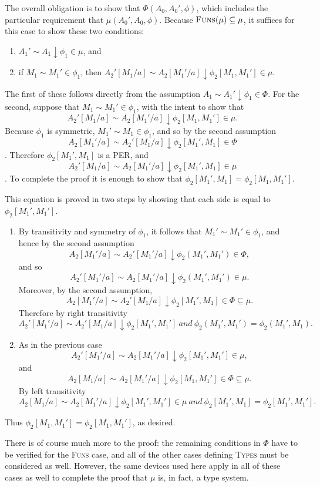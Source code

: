 \documentclass[11pt,twoside]{article}
\begin{document}
The overall obligation is to show that $\Phi(A_{0},A_{0}',\phi)$, which includes the particular
requirement that $\mu(A_{0}',A_{0},\phi)$.  Because $\textsc{Funs}(\mu)\subseteq\mu$, it suffices for this
case to show these two conditions:
\begin{enumerate}
\item $A_{1}'\sim A_{1}\downarrow\phi_{1}\in\mu$, and
\item if $M_1\sim M_1'\in\phi_{1}$, then $A_{2}'[M_1/a]\sim A_{2}[M_1'/a]\downarrow\phi_{2}[M_1,M_1']\in\mu$.
\end{enumerate}
The first of these follows directly from the assumption
$A_{1}\sim A_{1}'\downarrow\phi_{1}\in\Phi$.  For the second, suppose that
$M_1\sim M_1'\in\phi_{1}$, with the intent to show that
$$A_{2}'[M_1/a]\sim A_{2}[M_1'/a]\downarrow \phi_{2}[M_1,M_1']\in\mu.$$  Because $\phi_{1}$ is symmetric,
$M_1'\sim M_1\in\phi_{1}$, and so by the second assumption
$$A_{2}[M_1'/a] \sim A_{2}'[M_1/a]\downarrow\phi_{2}[M_1',M_1]\in\Phi$$.  Therefore $\phi_{2}[M_1',M_1]$ is a
PER, and
$$A_{2}'[M_1/a]\sim A_{2}[M_1'/a]\downarrow\phi_{2}[M_1',M_1]\in\mu$$.  To complete the proof it is
enough to show that $\phi_{2}[M_1',M_1]=\phi_{2}[M_1,M_1']$.

This equation is proved in two steps by showing that each side is equal to
$\phi_{2}[M_{1}',M_{1}']$.
\begin{enumerate}
\item By transitivity and symmetry of $\phi_{1}$, it follows that $M_{1}'\sim M_{1}'\in\phi_{1}$, and
  hence by the second assumption $$A_{2}[M_{1}'/a]\sim
  A_{2}'[M_{1}'/a]\downarrow\phi_{2}(M_{1}',M_{1}')\in\Phi,$$ and so
  $$A_{2}'[M_{1}'/a]\sim A_{2}[M_{1}'/a]\downarrow\phi_{2}(M_{1}',M_{1}')\in\mu.$$
  Moreover, by the second assumption, $$A_{2}[M_{1}'/a] \sim
  A_{2}'[M_{1}/a]\downarrow\phi_{2}[M_{1}',M_{1}]\in\Phi\subseteq\mu.$$
  Therefore by right transitivity
  $$A_{2}'[M_{1}'/a]\sim A_{2}'[M_{1}/a]\downarrow\phi_{2}[M_{1}',M_{1}']\ \textit{and}\ \phi_{2}(M_{1}',M_{1}')=\phi_{2}(M_{1}',M_{1}).$$
\item As in the previous case $$A_{2}'[M_{1}'/a] \sim A_{2}[M_{1}'/a] \downarrow \phi_{2}[M_{1}',M_{1}']\in\mu,$$
  and $$A_{2}[M_{1}/a]\sim A_{2}[M_{1}'/a]\downarrow\phi_{2}[M_{1},M_{1}']\in\Phi\subseteq\mu.$$
  By left transitivity
  $$A_{2}[M_{1}/a] \sim A_{2}[M_{1}'/a] \downarrow \phi_{2}[M_{1}',M_{1}']\in\mu\ \textit{and}\
  \phi_2[M_1',M_1]=\phi_2[M_1',M_1'].$$
\end{enumerate}
Thus $\phi_{2}[M_{1},M_{1}']=\phi_{2}[M_{1},M_{1}']$, as desired.

\bigskip

There is of course much more to the proof: the remaining conditions in $\Phi$ have to be
verified for the \textsc{Funs} case, and all of the other cases defining \textsc{Types}
must be considered as well.  However, the same devices used here apply in all of these
cases as well to complete the proof that $\mu$ is, in fact, a type system.
\end{document}
